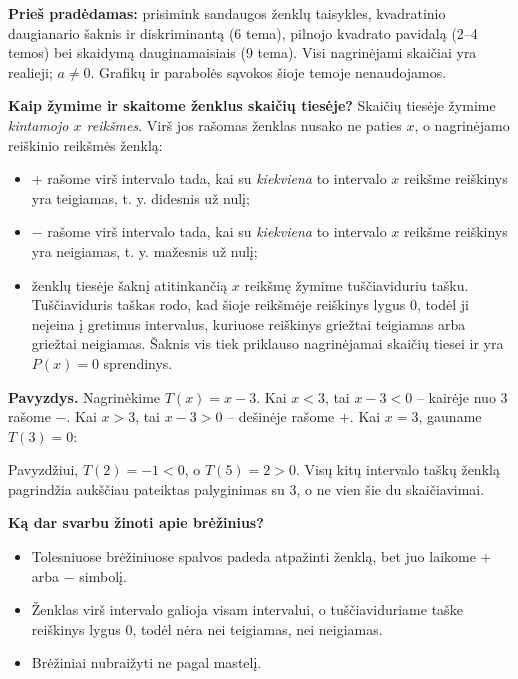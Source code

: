 \documentclass[12pt,a4paper]{article}
\begin{document}
\textbf{Prieš pradėdamas:} prisimink sandaugos ženklų taisykles, kvadratinio daugianario šaknis ir diskriminantą (6 tema), pilnojo kvadrato pavidalą (2–4 temos) bei skaidymą dauginamaisiais (9 tema). Visi nagrinėjami skaičiai yra realieji; $a\ne0$. Grafikų ir parabolės sąvokos šioje temoje nenaudojamos.

\textbf{Kaip žymime ir skaitome ženklus skaičių tiesėje?} Skaičių tiesėje žymime \emph{kintamojo $x$ reikšmes}. Virš jos rašomas ženklas nusako ne paties $x$, o nagrinėjamo reiškinio reikšmės ženklą:
\begin{itemize}[leftmargin=*,itemsep=1pt,topsep=2pt]
\item \textcolor{green!45!black}{\textbf{$+$}} rašome virš intervalo tada, kai su \emph{kiekviena} to intervalo $x$ reikšme reiškinys yra teigiamas, t. y. didesnis už nulį;
\item \textcolor{red!75!black}{\textbf{$-$}} rašome virš intervalo tada, kai su \emph{kiekviena} to intervalo $x$ reikšme reiškinys yra neigiamas, t. y. mažesnis už nulį;
\item ženklų tiesėje šaknį atitinkančią $x$ reikšmę žymime tuščiaviduriu tašku. Tuščiaviduris taškas rodo, kad šioje reikšmėje reiškinys lygus $0$, todėl ji neįeina į gretimus intervalus, kuriuose reiškinys griežtai teigiamas arba griežtai neigiamas. Šaknis vis tiek priklauso nagrinėjamai skaičių tiesei ir yra $P(x)=0$ sprendinys.
\end{itemize}
\textbf{Pavyzdys.} Nagrinėkime $T(x)=x-3$. Kai $x<3$, tai $x-3<0$ – kairėje nuo $3$ rašome $-$. Kai $x>3$, tai $x-3>0$ – dešinėje rašome $+$. Kai $x=3$, gauname $T(3)=0$:
\begin{center}
\end{center}
Pavyzdžiui, $T(2)=-1<0$, o $T(5)=2>0$. Visų kitų intervalo taškų ženklą pagrindžia aukščiau pateiktas palyginimas su $3$, o ne vien šie du skaičiavimai.

\medskip
\textbf{Ką dar svarbu žinoti apie brėžinius?}
\begin{itemize}[leftmargin=*,itemsep=1pt,topsep=2pt]
\item Tolesniuose brėžiniuose spalvos padeda atpažinti ženklą, bet juo laikome $+$ arba $-$ simbolį.
\item Ženklas virš intervalo galioja visam intervalui, o tuščiaviduriame taške reiškinys lygus $0$, todėl nėra nei teigiamas, nei neigiamas.
\item Brėžiniai nubraižyti ne pagal mastelį.
\end{itemize}
\end{document}
